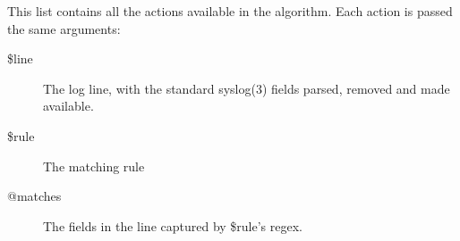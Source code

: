 \documentclass[a4paper,12pt,draft]{article}
\begin{document}
\label{actions-in-detail}

This list contains all the actions available in the algorithm.  Each action
is passed the same arguments: 

\begin{description}

    \item [\$line] The log line, with the standard syslog(3) fields parsed,
        removed and made available.
        
    \item [\$rule] The matching rule
        
    \item [@matches] The fields in the line captured by \$rule's regex.

\end{description}
\end{document}
